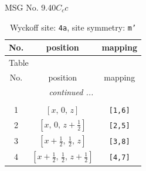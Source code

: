 \documentclass[fleqn,8pt]{jsarticle}
\begin{document}
\setcounter{MaxMatrixCols}{32}

\renewcommand{\tablename}{Table~}
\renewcommand{\figurename}{Figure~}
\begin{center}
\LARGE
MSG No. 9.40\quad$C_{c}c$
\end{center}
\renewcommand{\arraystretch}{1.2}
\begin{longtable}{ccc}
\caption{Wyckoff site: {\tt 4a}, site symmetry: {\tt m'}}
 \\
 \hline \hline
No. & position & mapping \\ \hline \endfirsthead

\multicolumn{2}{l}{\tablename\ \thetable{}} \\
 \hline \hline
No. & position & mapping \\ \hline \endhead

 \hline \hline
\multicolumn{2}{r}{\footnotesize\it continued ...} \\ \endfoot

 \hline \hline
\multicolumn{2}{r}{} \\ \endlastfoot

1 & $\left[ x,\, 0,\, z \right]$ & {\tt [1,6]} \\ \hline
2 & $\left[ x,\, 0,\, z + \frac{1}{2} \right]$ & {\tt [2,5]} \\ \hline
3 & $\left[ x + \frac{1}{2},\, \frac{1}{2},\, z \right]$ & {\tt [3,8]} \\ \hline
4 & $\left[ x + \frac{1}{2},\, \frac{1}{2},\, z + \frac{1}{2} \right]$ & {\tt [4,7]} \\
\end{longtable}
\renewcommand{\arraystretch}{1.2}
\end{document}
